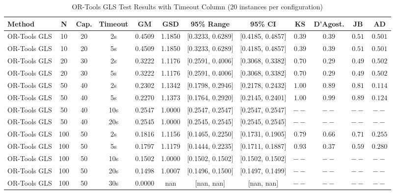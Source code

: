 \begin{table*}[htbp]
\centering
\caption{OR-Tools GLS Test Results with Timeout Column (20 instances per configuration)}
\label{tab:ortools-gls-timeout}
\begin{tabular}{@{}l c c c S[table-format=1.4] S[table-format=1.4] c c c c c c@{}}
\toprule
\textbf{Method} & \textbf{N} & \textbf{Cap.} & \textbf{Timeout} & {\textbf{GM}} & {\textbf{GSD}} & \textbf{95\% Range} & \textbf{95\% CI} & \textbf{KS} & \textbf{D'Agost.} & \textbf{JB} & \textbf{AD} \\
\midrule
OR-Tools GLS & 10 & 20 & 2s & 0.4509 & 1.1850 & [0.3233, 0.6289] & [0.4185, 0.4857] & $0.39$ & $0.39$ & $0.51$ & $0.501$ \\
OR-Tools GLS & 10 & 20 & 5s & 0.4509 & 1.1850 & [0.3233, 0.6289] & [0.4185, 0.4857] & $0.39$ & $0.39$ & $0.51$ & $0.501$ \\
OR-Tools GLS & 20 & 30 & 2s & 0.3222 & 1.1176 & [0.2591, 0.4006] & [0.3068, 0.3382] & $0.70$ & $0.29$ & $0.49$ & $0.502$ \\
OR-Tools GLS & 20 & 30 & 5s & 0.3222 & 1.1176 & [0.2591, 0.4006] & [0.3068, 0.3382] & $0.70$ & $0.29$ & $0.49$ & $0.502$ \\
OR-Tools GLS & 50 & 40 & 2s & 0.2302 & 1.1342 & [0.1798, 0.2946] & [0.2178, 0.2432] & $1.00$ & $0.89$ & $0.81$ & $0.114$ \\
OR-Tools GLS & 50 & 40 & 5s & 0.2270 & 1.1373 & [0.1764, 0.2920] & [0.2145, 0.2401] & $1.00$ & $0.99$ & $0.89$ & $0.124$ \\
OR-Tools GLS & 50 & 40 & 10s & 0.2547 & 1.0000 & [0.2547, 0.2547] & [0.2547, 0.2547] & $--$ & $--$ & $--$ & $--$ \\
OR-Tools GLS & 50 & 40 & 20s & 0.2545 & 1.0000 & [0.2545, 0.2545] & [0.2545, 0.2545] & $--$ & $--$ & $--$ & $--$ \\
OR-Tools GLS & 100 & 50 & 2s & 0.1816 & 1.1156 & [0.1465, 0.2250] & [0.1731, 0.1905] & $0.79$ & $0.66$ & $0.71$ & $0.255$ \\
OR-Tools GLS & 100 & 50 & 5s & 0.1797 & 1.1179 & [0.1444, 0.2235] & [0.1711, 0.1887] & $0.93$ & $0.37$ & $0.59$ & $0.280$ \\
OR-Tools GLS & 100 & 50 & 10s & 0.1502 & 1.0000 & [0.1502, 0.1502] & [0.1502, 0.1502] & $--$ & $--$ & $--$ & $--$ \\
OR-Tools GLS & 100 & 50 & 20s & 0.1498 & 1.0007 & [0.1496, 0.1500] & [0.1497, 0.1499] & $--$ & $--$ & $--$ & $--$ \\
OR-Tools GLS & 100 & 50 & 30s & 0.0000 & nan & [nan, nan] & [nan, nan] & $--$ & $--$ & $--$ & $--$ \\

\end{tabular}
\end{table*}
